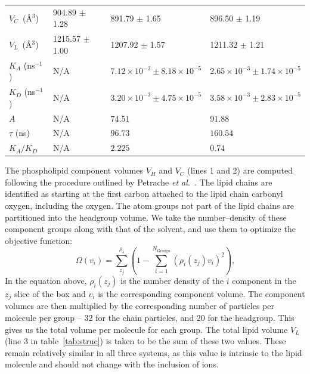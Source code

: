 \documentclass[12pt,openany,final]{book}
\newcommand{\etal}{\textit{et al.}}
\begin{document}
\begin{table}
{\begin{tabularx}{\textwidth}{X|X|X|X}
        $V_C$~(\AA$^3$)     & 904.89 $\pm$ 1.28  & 891.79 $\pm$ 1.65                       & 896.50 $\pm$ 1.19         \\
        $V_L$~(\AA$^3$)     & 1215.57 $\pm$ 1.00 & 1207.92 $\pm$ 1.57                      & 1211.32 $\pm$ 1.21    \\
        $K_{A}$ (ns$^{-1}$) & N/A                & $7.12\times10^{-3}\pm8.18\times10^{-5}$ & $2.65\times10^{-3}\pm1.74\times10^{-5}$ \\
        $K_{D}$ (ns$^{-1}$) & N/A                & $3.20\times10^{-3}\pm4.75\times10^{-5}$ & $3.58\times10^{-3}\pm2.83\times10^{-5}$ \\
        $A$                 & N/A                & $74.51$                                 & $91.88$ \\
        $\tau$      (ns)    & N/A                & $96.73$                                 & $160.54$ \\
        $K_{A}/K_{D}$       & N/A                & $2.225$                                 & $0.74$ \\
        \end{tabularx}
        }
\end{table}
The phospholipid component volumes $V_H$ and $V_C$ (lines 1 and 2) are
computed following the procedure outlined by Petrache \etal~\cite{petrache:1997}. 
The lipid chains are identified as starting at the first carbon attached to the lipid chain carbonyl oxygen, including the oxygen.
The atom groups not part of the lipid
chains are partitioned into the headgroup volume. 
We take the number--density of these component groups along with that of the solvent, 
and use them to optimize the objective function:
\begin{equation}
    \label{eq:volumeobj}
    \Omega(v_i)=\sum^{\rho_s}_{z_j}(1-\sum^{N_{\text{Groups}}}_{i=1}{(\rho_i(z_j)v_i)^2})\text{,}
\end{equation}
In the equation above, $\rho_i(z_j)$ is the number density of the $i$ component in the
$z_j$ slice of the box and $v_i$ is the corresponding component volume. 
The component volumes are then multiplied by the corresponding
number of particles per molecule per group -- 32 for the chain
particles, and 20 for the headgroup. 
This gives us the total volume per molecule for each group. 
The total lipid volume $V_L$ (line 3 in table~\ref{tab:struc}) 
is taken to be the sum of these two values. 
These remain relatively similar in all three systems, 
as this value is intrinsic to the lipid molecule 
and should not change with the inclusion of ions.
\end{document}
